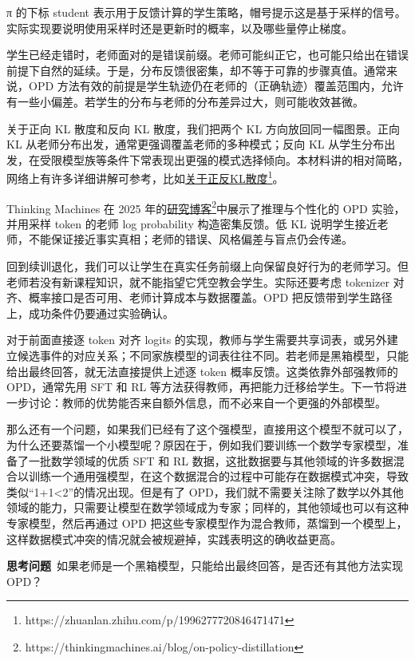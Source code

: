 π 的下标 student 表示用于反馈计算的学生策略，帽号提示这是基于采样的信号。实际实现要说明使用采样时还是更新时的概率，以及哪些量停止梯度。

学生已经走错时，老师面对的是错误前缀。老师可能纠正它，也可能只给出在错误前提下自然的延续。于是，分布反馈很密集，却不等于可靠的步骤真值。通常来说，OPD 方法有效的前提是学生轨迹仍在老师的（正确轨迹）覆盖范围内，允许有一些小偏差。若学生的分布与老师的分布差异过大，则可能收效甚微。

关于正向 KL 散度和反向 KL 散度，我们把两个 KL 方向放回同一幅图景。正向 KL 从老师分布出发，通常更强调覆盖老师的多种模式；反向 KL 从学生分布出发，在受限模型族等条件下常表现出更强的模式选择倾向。本材料讲的相对简略，网络上有许多详细讲解可参考，比如\href{https://zhuanlan.zhihu.com/p/1996277720846471471}{关于正反KL散度}\footnote{https://zhuanlan.zhihu.com/p/1996277720846471471}。

Thinking Machines 在 2025 年的\href{https://thinkingmachines.ai/blog/on-policy-distillation/}{研究博客}\footnote{https://thinkingmachines.ai/blog/on-policy-distillation}中展示了推理与个性化的 OPD 实验，并用采样 token 的老师 log probability 构造密集反馈。低 KL 说明学生接近老师，不能保证接近事实真相；老师的错误、风格偏差与盲点仍会传递。

回到续训退化，我们可以让学生在真实任务前缀上向保留良好行为的老师学习。但老师若没有新课程知识，就不能指望它凭空教会学生。实际还要考虑 tokenizer 对齐、概率接口是否可用、老师计算成本与数据覆盖。OPD 把反馈带到学生路径上，成功条件仍要通过实验确认。

对于前面直接逐 token 对齐 logits 的实现，教师与学生需要共享词表，或另外建立候选事件的对应关系；不同家族模型的词表往往不同。若老师是黑箱模型，只能给出最终回答，就无法直接提供上述逐 token 概率反馈。这类依靠外部强教师的 OPD，通常先用 SFT 和 RL 等方法获得教师，再把能力迁移给学生。下一节将进一步讨论：教师的优势能否来自额外信息，而不必来自一个更强的外部模型。

那么还有一个问题，如果我们已经有了这个强模型，直接用这个模型不就可以了，为什么还要蒸馏一个小模型呢？原因在于，例如我们要训练一个数学专家模型，准备了一批数学领域的优质 SFT 和 RL 数据，这批数据要与其他领域的许多数据混合以训练一个通用强模型，在这个数据混合的过程中可能存在数据模式冲突，导致类似``1+1<2''的情况出现。但是有了 OPD，我们就不需要关注除了数学以外其他领域的能力，只需要让模型在数学领域成为专家；同样的，其他领域也可以有这种专家模型，然后再通过 OPD 把这些专家模型作为混合教师，蒸馏到一个模型上，这样数据模式冲突的情况就会被规避掉，实践表明这的确收益更高。

\textbf{思考问题}~如果老师是一个黑箱模型，只能给出最终回答，是否还有其他方法实现 OPD？

